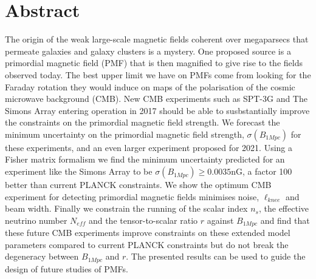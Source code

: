 \section*{Abstract}

The origin of the weak large-scale magnetic fields coherent over megaparsecs that permeate galaxies and galaxy clusters is a mystery. 
One proposed source is a primordial magnetic field (PMF) that is then magnified to give rise to the fields observed today. The best upper limit we have on PMFs come from looking for the Faraday rotation they would induce on maps of the polarisation of the cosmic microwave background (CMB). New CMB experiments such as SPT-3G and The Simons Array entering operation in 2017 should be able to susbstantially improve the constraints on the primordial magnetic field strength. We forecast the minimum uncertainty on the primordial magnetic field strength, $\sigma(B_{1Mpc})$ for these experiments, and an even larger experiment proposed for 2021.
Using a Fisher matrix formalism we find the minimum uncertainty predicted for an experiment like the Simons Array to be $\sigma(B_{1Mpc}) \geq 0.0035$nG, a factor 100 better than current PLANCK constraints. We show the optimum CMB experiment for detecting primordial magnetic fields minimises noise, $\ell_{knee}$ and beam width. Finally we constrain the running of the scalar index $n_{s}$, the effective neutrino number $N_{eff}$ and the tensor-to-scalar ratio $r$ against $B_{1Mpc}$ and find that these future CMB experiments improve constraints on these extended model parameters compared to current PLANCK constraints but do not break the degeneracy between $B_{1Mpc}$ and $r$. The presented results can be used to guide the design of future studies of PMFs.